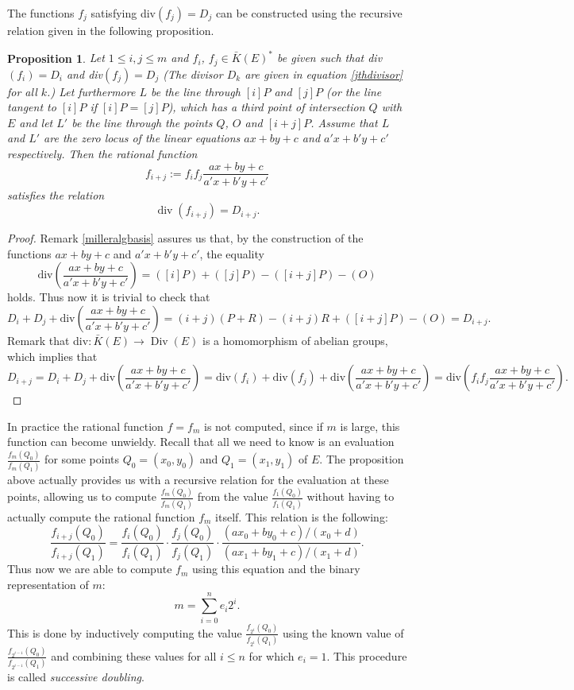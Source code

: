 \documentclass{article}
\numberwithin{equation}{section}
\newtheorem{proposition}[theorem]{Proposition}
\theoremstyle{definition}
\newcommand{\Div}{\operatorname{Div}} %
\begin{document}
The functions $f_j$ satisfying div$(f_j)=D_j$ can be constructed using the recursive relation given in the following proposition. 

\begin{proposition}\label{Milleralgprop}
Let $1 \leq i,j \leq m$ and $f_i$, $f_j \in \bar{K}(E)^*$ be given such that div$(f_i)=D_i$ and div$(f_j)=D_j$ (The divisor $D_k$ are given in equation \ref{jthdivisor} for all $k$.) Let furthermore $L$ be the line through $[i]P$ and $[j]P$ (or the line tangent to $[i]P$ if $[i]P=[j]P$), which has a third point of intersection $Q$ with $E$ and let $L'$ be the line through the points $Q$, $O$ and $[i+j]P$. Assume that $L$ and $L'$ are the zero locus of the linear equations $ax+by+c$ and $a'x+b'y+c'$ respectively. Then the rational function $$f_{i+j}:=f_if_j\frac{ax+by+c}{a'x+b'y+c'}$$ satisfies the relation $$\operatorname{div}(f_{i+j}) = D_{i+j}.$$
\end{proposition}

\begin{proof}
Remark \ref{milleralgbasis} assures us that, by the construction of the functions $ax+by+c$ and $a'x+b'y+c'$, the equality $$\text{div}\left(\frac{ax+by+c}{a'x+b'y+c'} \right) = ([i]P)+([j]P)-([i+j]P)-(O)$$ holds. Thus now it is trivial to check that $$D_i+D_j+\text{div}\left(\frac{ax+by+c}{a'x+b'y+c'} \right) = (i+j)(P+R)-(i+j)R+([i+j]P)-(O)=D_{i+j}.$$ Remark that div$:\bar{K}(E) \rightarrow \Div(E)$ is a homomorphism of abelian groups, which implies that $$D_{i+j} = D_i+D_j+\text{div}\left(\frac{ax+by+c}{a'x+b'y+c'} \right) = \text{div}(f_i)+\text{div}(f_j)+\text{div}\left(\frac{ax+by+c}{a'x+b'y+c'} \right) = \text{div}\left(f_if_j\frac{ax+by+c}{a'x+b'y+c'}\right).$$
\end{proof}

In practice the rational function $f=f_m$ is not computed, since if $m$ is large, this function can become unwieldy. Recall that all we need to know is an evaluation $\frac{f_m(Q_0)}{f_m(Q_1)}$ for some points $Q_0=(x_0,y_0)$ and $Q_1=(x_1,y_1)$ of $E$. The proposition above actually provides us with a recursive relation for the evaluation at these points, allowing us to compute $\frac{f_m(Q_0)}{f_m(Q_1)}$ from the value $\frac{f_1(Q_0)}{f_1(Q_1)}$ without having to actually compute the rational function $f_m$ itself. This relation is the following: 
\begin{equation}\label{evoffm}\frac{f_{i+j}(Q_0)}{f_{i+j}(Q_1)} = \frac{f_i(Q_0)}{f_i(Q_1)} \cdot \frac{f_j(Q_0)}{f_j(Q_1)} \cdot \frac{(ax_0+by_0+c)/(x_0+d)}{(ax_1+by_1+c)/(x_1+d)}. \end{equation} Thus now we are able to compute $f_m$ using this equation and the binary representation of $m$: $$m=\sum_{i=0}^n e_i 2^i.$$ This is done by inductively computing the value {\large $\frac{f_{2^i}(Q_0)}{f_{2^i}(Q_1)}$} using the known value of {\large $\frac{f_{2^{i-1}}(Q_0)}{f_{2^{i-1}}(Q_1)}$} and combining these values for all $i\leq n$ for which $e_i =1$. This procedure is called \emph{successive doubling}. \newpage
\end{document}
